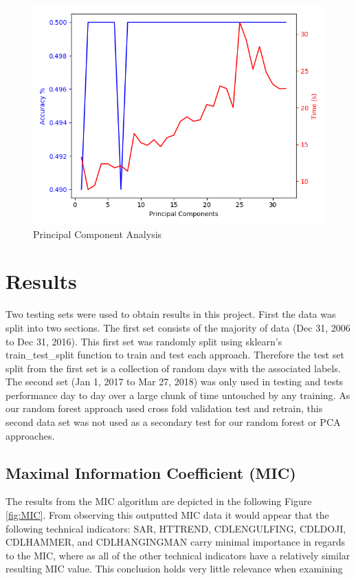 \documentclass{article}\raggedbottom
\begin{document}
\begin{figure}[h!]
	\centering
	\includegraphics[width=\linewidth]{data/PCAT1.png}
	\caption{Principal Component Analysis}
	\label{fig:PCA}
\end{figure}

\section{Results}
Two testing sets were used to obtain results in this project. First the data was split into two sections. The first set consists of the majority of data (Dec 31, 2006 to Dec 31, 2016). This first set was randomly split using sklearn's train\_test\_split function to train and test each approach. Therefore the test set split from the first set is a collection of random days with the associated labels. The second set (Jan 1, 2017 to Mar 27, 2018) was only used in testing and tests performance day to day over a large chunk of time untouched by any training. As our random forest approach used cross fold validation test and retrain, this second data set was not used as a secondary test for our random forest or PCA approaches.
\subsection{Maximal Information Coefficient (MIC)}
The results from the MIC algorithm are depicted in the following Figure \ref{fig:MIC}. From observing this outputted MIC data it would appear that the following technical indicators: SAR, HT\textunderscore TREND, CDLENGULFING, CDLDOJI, CDLHAMMER, and CDLHANGINGMAN carry minimal importance in regards to the MIC, where as all of the other technical indicators have a relatively similar resulting MIC value. This conclusion holds very little relevance when examining 
\end{document}
